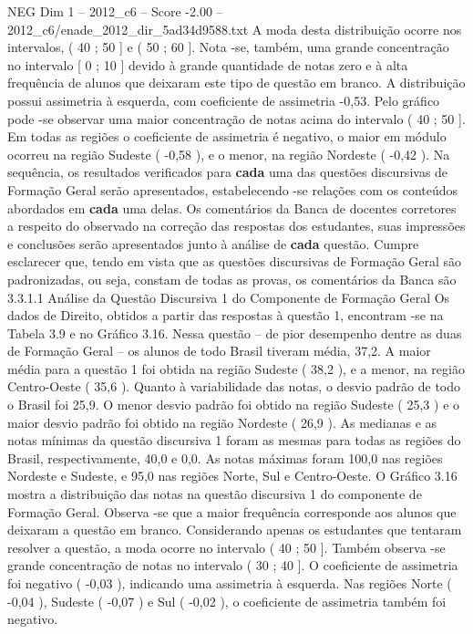 \begin{textsample}{NEG Dim 1 – 2012\_c6 – Score -2.00 – 2012\_c6/enade\_2012\_dir\_5ad34d9588.txt}
A moda desta distribuição ocorre nos intervalos, ( 40 ; 50 ] e ( 50 ; 60 ].
Nota -se, também, uma grande concentração no intervalo [ 0 ; 10 ] devido à grande quantidade de notas zero e à alta frequência de alunos que deixaram este tipo de questão em branco.
A distribuição possui assimetria à esquerda, com coeficiente de assimetria -0,53.
Pelo gráfico pode -se observar uma maior concentração de notas acima do intervalo ( 40 ; 50 ].
Em todas as regiões o coeficiente de assimetria é negativo, o maior em módulo ocorreu na região Sudeste ( -0,58 ), e o menor, na região Nordeste ( -0,42 ).
Na sequência, os resultados verificados para \textbf{cada} uma das questões discursivas de Formação Geral serão apresentados, estabelecendo -se relações com os conteúdos abordados em \textbf{cada} uma delas.
Os comentários da Banca de docentes corretores a respeito do observado na correção das respostas dos estudantes, suas impressões e conclusões serão apresentados junto à análise de \textbf{cada} questão.
Cumpre esclarecer que, tendo em vista que as questões discursivas de Formação Geral são padronizadas, ou seja, constam de todas as provas, os comentários da Banca são 3.3.1.1 Análise da Questão Discursiva 1 do Componente de Formação Geral Os dados de Direito, obtidos a partir das respostas à questão 1, encontram -se na Tabela 3.9 e no Gráfico 3.16.
Nessa questão – de pior desempenho dentre as duas de Formação Geral – os alunos de todo Brasil tiveram média, 37,2.
A maior média para a questão 1 foi obtida na região Sudeste ( 38,2 ), e a menor, na região Centro-Oeste ( 35,6 ).
Quanto à variabilidade das notas, o desvio padrão de todo o Brasil foi 25,9.
O menor desvio padrão foi obtido na região Sudeste ( 25,3 ) e o maior desvio padrão foi obtido na região Nordeste ( 26,9 ).
As medianas e as notas mínimas da questão discursiva 1 foram as mesmas para todas as regiões do Brasil, respectivamente, 40,0 e 0,0.
As notas máximas foram 100,0 nas regiões Nordeste e Sudeste, e 95,0 nas regiões Norte, Sul e Centro-Oeste.
O Gráfico 3.16 mostra a distribuição das notas na questão discursiva 1 do componente de Formação Geral.
Observa -se que a maior frequência corresponde aos alunos que deixaram a questão em branco.
Considerando apenas os estudantes que tentaram resolver a questão, a moda ocorre no intervalo ( 40 ; 50 ].
Também observa -se grande concentração de notas no intervalo ( 30 ; 40 ].
O coeficiente de assimetria foi negativo ( -0,03 ), indicando uma assimetria à esquerda.
Nas regiões Norte ( -0,04 ), Sudeste ( -0,07 ) e Sul ( -0,02 ), o coeficiente de assimetria também foi negativo.

\end{textsample}
